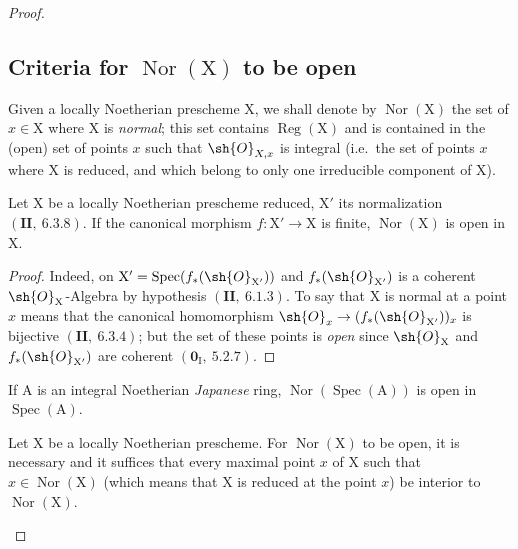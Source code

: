 \begin{proof}
\subsection{Criteria for \texorpdfstring{$\operatorname{Nor}(\mathrm{X})$}{Nor(X)} to be open}
\label{subsection:IV.6.13}
\label{IV.6.13}

\begin{env}[6.13.1]
\label{IV.6.13.1}
Given a locally Noetherian prescheme $\mathrm{X}$, we shall denote by
$\operatorname{Nor}(\mathrm{X})$ the set of $x\in\mathrm{X}$ where $\mathrm{X}$ is \emph{normal}; this set contains $\operatorname{Reg}(\mathrm{X})$ and is
contained in the (open) set of points $x$ such that $\sh{O}_{X,x}$ is integral (i.e.\ the set
of points $x$ where $\mathrm{X}$ is reduced, and which belong to only one irreducible component
of $\mathrm{X}$).
\end{env}

\begin{proposition}[6.13.2]
\label{IV.6.13.2}
Let $\mathrm{X}$ be a locally Noetherian prescheme reduced, $\mathrm{X}'$ its
normalization $(\mathbf{II},~6.3.8)$. If the canonical morphism $f:\mathrm{X}'\to\mathrm{X}$ is finite, $\operatorname{Nor}(\mathrm{X})$ is open in $\mathrm{X}$.
\end{proposition}

\begin{proof}
Indeed, on $\mathrm{X}'=\operatorname{Spec}(f_*(\sh{O}_{\mathrm{X}'}))$ and $f_*(\sh{O}_{\mathrm{X}'})$ is a coherent $\sh{O}_\mathrm{X}$-Algebra by
hypothesis $(\mathbf{II},~6.1.3)$. To say that $\mathrm{X}$ is normal at a point $x$ means that the canonical
homomorphism $\sh{O}_x\to(f_*(\sh{O}_{\mathrm{X}'}))_x$ is bijective $(\mathbf{II},~6.3.4)$; but the set of these points is \emph{open}
since $\sh{O}_\mathrm{X}$ and $f_*(\sh{O}_{\mathrm{X}'})$ are coherent $(\mathbf{0}_\mathrm{I},~5.2.7)$.
\end{proof}

\begin{corollary}[6.13.3]
\label{IV.6.13.3}
If $\mathrm{A}$ is an integral Noetherian \emph{Japanese} ring, $\operatorname{Nor}(\operatorname{Spec}(\mathrm{A}))$
is open in $\operatorname{Spec}(\mathrm{A})$.
\end{corollary}

\begin{proposition}[6.13.4]
\label{IV.6.13.4}
Let $\mathrm{X}$ be a locally Noetherian prescheme. For $\operatorname{Nor}(\mathrm{X})$
to be open, it is necessary and it suffices that every maximal point $x$ of $\mathrm{X}$ such that $x\in\operatorname{Nor}(\mathrm{X})$ (which means
that $\mathrm{X}$ is reduced at the point $x$) be interior to $\operatorname{Nor}(\mathrm{X})$.
\end{proposition}


\end{proof}
